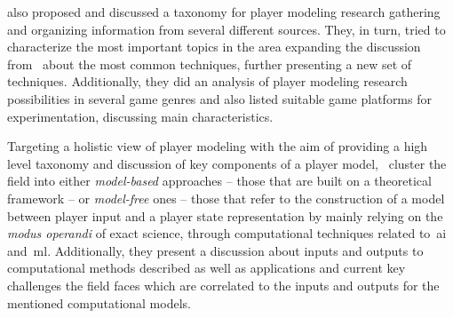 \cite{machado_player_2011} also proposed and discussed a taxonomy for player modeling research gathering and organizing information from several different sources. They, in turn, tried to characterize the most important topics in the area expanding the discussion from~\cite{herik_opponent_2005} about the most common techniques, further presenting a new set of techniques. Additionally, they did an analysis of player modeling research possibilities in several game genres and also listed suitable game platforms for experimentation, discussing main characteristics.

Targeting a holistic view of player modeling with the aim of providing a high level taxonomy and discussion of key components of a player model,~\cite{yannakakis_player_2013} cluster the field into either \textit{model-based} approaches -- those that are built on a theoretical framework -- or \textit{model-free} ones -- those that refer to the construction of a model between player input and a player state representation by mainly relying on the \textit{modus operandi} of exact science, through computational techniques related to~\gls{ai} and~\gls{ml}. Additionally, they present a discussion about inputs and outputs to computational methods described as well as applications and current key challenges the field faces which are correlated to the inputs and outputs for the mentioned computational models.

